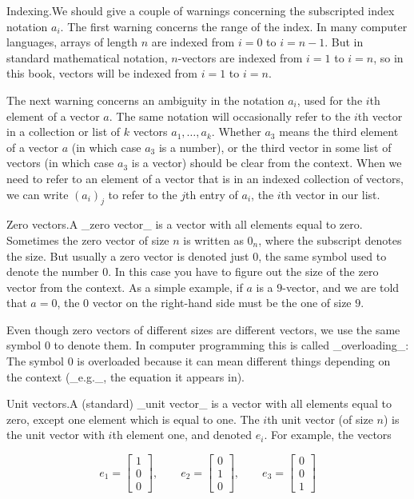 
Indexing.We should give a couple of warnings concerning the subscripted index notation \(a_{i}\). The first warning concerns the range of the index. In many computer languages, arrays of length \(n\) are indexed from \(i=0\) to \(i=n-1\). But in standard mathematical notation, \(n\)-vectors are indexed from \(i=1\) to \(i=n\), so in this book, vectors will be indexed from \(i=1\) to \(i=n\).

The next warning concerns an ambiguity in the notation \(a_{i}\), used for the \(i\)th element of a vector \(a\). The same notation will occasionally refer to the \(i\)th vector in a collection or list of \(k\) vectors \(a_{1},\ldots,a_{k}\). Whether \(a_{3}\) means the third element of a vector \(a\) (in which case \(a_{3}\) is a number), or the third vector in some list of vectors (in which case \(a_{3}\) is a vector) should be clear from the context. When we need to refer to an element of a vector that is in an indexed collection of vectors, we can write \((a_{i})_{j}\) to refer to the \(j\)th entry of \(a_{i}\), the \(i\)th vector in our list.

Zero vectors.A _zero vector_ is a vector with all elements equal to zero. Sometimes the zero vector of size \(n\) is written as \(0_{n}\), where the subscript denotes the size. But usually a zero vector is denoted just \(0\), the same symbol used to denote the number \(0\). In this case you have to figure out the size of the zero vector from the context. As a simple example, if \(a\) is a \(9\)-vector, and we are told that \(a=0\), the \(0\) vector on the right-hand side must be the one of size \(9\).

Even though zero vectors of different sizes are different vectors, we use the same symbol \(0\) to denote them. In computer programming this is called _overloading_: The symbol \(0\) is overloaded because it can mean different things depending on the context (_e.g._, the equation it appears in).

Unit vectors.A (standard) _unit vector_ is a vector with all elements equal to zero, except one element which is equal to one. The \(i\)th unit vector (of size \(n\)) is the unit vector with \(i\)th element one, and denoted \(e_{i}\). For example, the vectors

\[e_{1}=\left[\begin{array}{c}1\\ 0\\ 0\end{array}\right],\qquad e_{2}=\left[\begin{array}{c}0\\ 1\\ 0\end{array}\right],\qquad e_{3}=\left[\begin{array}{c}0\\ 0\\ 1\end{array}\right]\]

